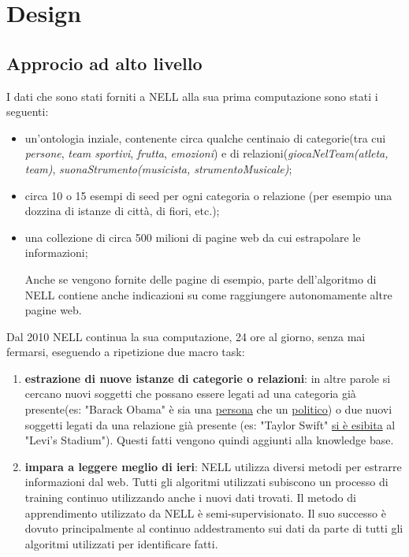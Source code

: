 \section{Design}
\subsection{Approcio ad alto livello}

I dati che sono stati forniti a NELL alla sua prima computazione sono stati i seguenti:
\begin{itemize}
    \item un'ontologia inziale, contenente circa qualche centinaio di categorie(tra cui \textit{persone}, \textit{team sportivi}, \textit{frutta}, \textit{emozioni}) e di relazioni(\textit{giocaNelTeam(atleta, team)}, \textit{suonaStrumento(musicista, strumentoMusicale)};
    \item circa 10 o 15 esempi di seed per ogni categoria o relazione (per esempio una dozzina di istanze di città, di fiori, etc.);
    \item una collezione di circa 500 milioni di pagine web da cui estrapolare le informazioni;
    \begin{info}
        Anche se vengono fornite delle pagine di esempio, parte dell'algoritmo di NELL contiene anche indicazioni su come raggiungere autonomamente altre pagine web.
    \end{info}
\end{itemize}

\noindent Dal 2010 NELL continua la sua computazione, 24 ore al giorno, senza mai fermarsi, eseguendo a ripetizione due macro task:
\begin{enumerate}
    \item \textbf{estrazione di nuove istanze di categorie o relazioni}: in altre parole si cercano nuovi soggetti che possano essere legati ad una categoria già presente(es: "Barack Obama" è sia una \underline{persona} che un \underline{politico}) o due nuovi soggetti legati da una relazione già presente (es: "Taylor Swift" \underline{si è esibita} al "Levi's Stadium"). Questi fatti vengono quindi aggiunti alla knowledge base.
    \item \textbf{impara a leggere meglio di ieri}: NELL utilizza diversi metodi per estrarre informazioni dal web. Tutti gli algoritmi utilizzati subiscono un processo di training continuo utilizzando anche i nuovi dati trovati. Il metodo di apprendimento utilizzato da NELL è semi-supervisionato. Il suo successo è dovuto principalmente al continuo addestramento sui dati da parte di tutti gli algoritmi utilizzati per identificare fatti\cite{ReadtheWebOverview:online}.
\end{enumerate}

